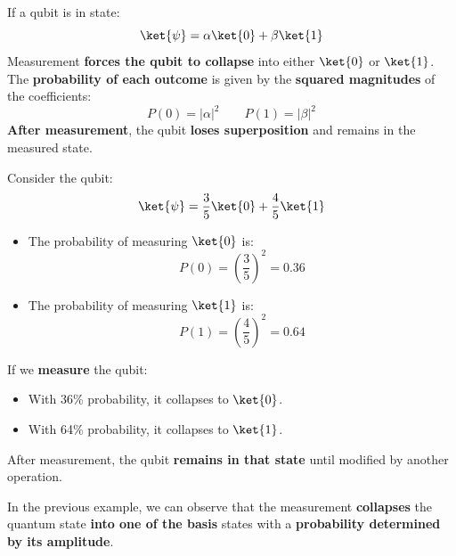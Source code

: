 \highspace
If a qubit is in state:
\begin{equation*}
    \ket{\psi} = \alpha \ket{0} + \beta \ket{1}
\end{equation*}
Measurement \textbf{forces the qubit to collapse} into either $\ket{0}$ or $\ket{1}$. The \textbf{probability of each outcome} is given by the \textbf{squared magnitudes} of the coefficients:
\begin{equation*}
    P\left(0\right) = \left|\alpha\right|^{2} \hspace{2em} P\left(1\right) = \left|\beta\right|^{2}
\end{equation*}
\textbf{After measurement}, the qubit \textbf{loses superposition} and remains in the measured state.

\highspace
\begin{examplebox}
    Consider the qubit:
    \begin{equation*}
        \ket{\psi} = \dfrac{3}{5}\ket{0} + \dfrac{4}{5}\ket{1}
    \end{equation*}
    \begin{itemize}
        \item The probability of measuring $\ket{0}$ is:
        \begin{equation*}
            P\left(0\right) = \left(\dfrac{3}{5}\right)^{2} = 0.36
        \end{equation*}
        \item The probability of measuring $\ket{1}$ is:
        \begin{equation*}
            P\left(1\right) = \left(\dfrac{4}{5}\right)^{2} = 0.64
        \end{equation*}
    \end{itemize}
    If we \textbf{measure} the qubit:
    \begin{itemize}
        \item With 36\% probability, it collapses to $\ket{0}$.
        \item With 64\% probability, it collapses to $\ket{1}$.
    \end{itemize}
    After measurement, the qubit \textbf{remains in that state} until modified by another operation.
\end{examplebox}

\noindent
In the previous example, we can observe that the measurement \textbf{collapses} the quantum state \textbf{into one of the basis} states with a \textbf{probability determined by its amplitude}.

\newpage

